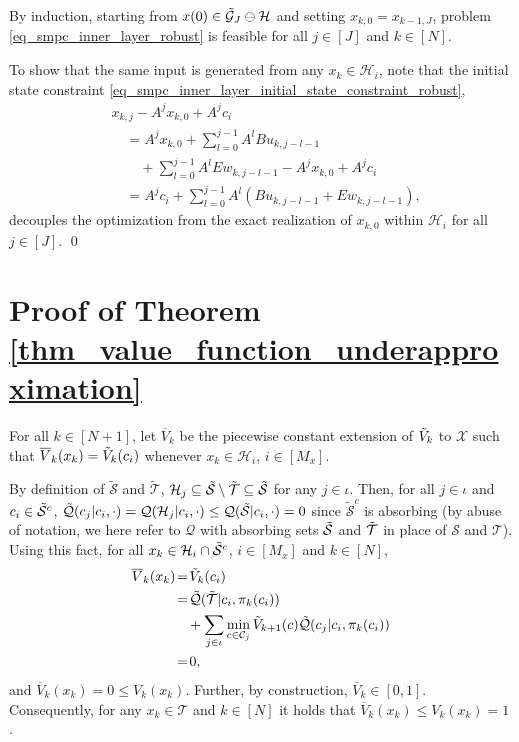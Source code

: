 \documentclass{IEEEtran}
\begin{document}
\begin{appendices}
By induction, starting from $x(0)\in\Tilde{\mathcal{G}}_J\ominus\mathcal{H}$ and setting $x_{k,0}=x_{k-1,J}$, problem \eqref{eq_smpc_inner_layer_robust} is feasible for all $j\in[J]$ and $k\in[N]$.


To show that the same input is generated from any $x_k\in\mathcal{H}_i$, note that the initial state constraint \eqref{eq_smpc_inner_layer_initial_state_constraint_robust},
\begin{align*}
    &x_{k,j} -A^jx_{k,0}+A^jc_i
    \\  &\quad= A^jx_{k,0} + \sum_{l=0}^{j-1}A^{l}Bu_{k,j-l-1} \\& \qquad + \sum_{l=0}^{j-1}A^{l}Ew_{k,j-l-1} -A^jx_{k,0}+A^jc_i
    \\ &\quad =A^jc_i+\sum_{l=0}^{j-1}A^{l}(Bu_{k,j-l-1} +Ew_{k,j-l-1}),
\end{align*}
decouples the optimization from the exact realization of $x_{k,0}$ within $\mathcal{H}_i$ for all $j\in[J]$. \qed



\section{Proof of Theorem \ref{thm_value_function_underapproximation}}
\label{app_proof_thm_value_function_underapproximation}
For all $k\in[N+1]$, let $\overline{V}_k$ be the piecewise constant extension of $\Tilde{V}_k$ to ${\mathcal{X}}$ such that $\overline{V}_k({x}_k)=\Tilde{V}_k({c}_i)$ whenever ${x}_k\in\mathcal{H}_i$, $i\in[M_x]$.

By definition of $\tilde{\mathcal{S}}$ and $\tilde{\mathcal{T}}$, $\mathcal{H}_j\subseteq \Tilde{\mathcal{S}}\setminus\Tilde{\mathcal{T}}\subseteq\tilde{\mathcal{S}}$ for any $j\in \iota$. Then, for all $j\in\iota$ and $c_i\in \Tilde{\mathcal{S}}^c$, $\tilde{\mathcal{Q}}(c_j|c_i,\cdot)={\mathcal{Q}}(\mathcal{H}_j|c_i,\cdot)\leq {\mathcal{Q}}(\Tilde{\mathcal{S}}|c_i,\cdot)=0$ since $\tilde{\mathcal{S}}^c$ is absorbing (by abuse of notation, we here refer to $\mathcal{Q}$ with absorbing sets $\Tilde{\mathcal{S}}$ and $\Tilde{\mathcal{T}}$ in place of $\mathcal{S}$ and $\mathcal{T}$). Using this fact, for all $x_k\in\mathcal{H}_i\cap\Tilde{\mathcal{S}}^c$, $i\in[M_x]$ and $k\in[N]$,
\begin{align*}
    \overline{V}_k(x_k)\!&=\!\Tilde{V}_k(c_i)
    \\&=\!\Tilde{\mathcal{Q}}(\Tilde{\mathcal{T}}| c_i,\pi_k(c_i))
    \\& \quad +\sum_{j\in\iota}\min_{c\in\mathcal{C}_j}\Tilde{V}_{k+1}({c})\Tilde{\mathcal{Q}}(c_j| c_i,\pi_k(c_i))\\&=\!0,
\end{align*}
and $\overline{V}_{k}(x_k)=0\leq V_k(x_k)$. Further, by construction, $\overline{V}_{k}\in[0,1]$. Consequently, for any $x_k\in\mathcal{T}$ and $k\in[N]$ it holds that $\overline{V}_k(x_k)\leq V_k(x_k)= 1$. 


\end{appendices}
\end{document}
